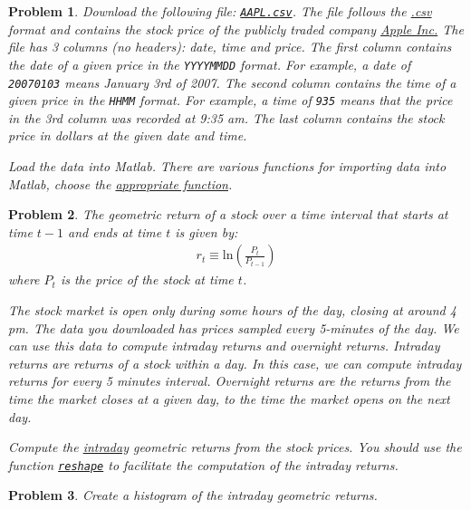 \documentclass[12pt, a4paper]{article}
\renewcommand{\ln}[1]{\text{ln}\left(#1\right)}
\newtheorem{problem}{Problem}
\begin{document}
\begin{problem}
Download the following file: \href{https://github.com/matlab-for-economists/data}{\texttt{AAPL.csv}}.
The file follows the \href{https://en.wikipedia.org/wiki/Comma-separated\_values}{.csv} format and contains the stock price of the publicly traded company \href{https://en.wikipedia.org/wiki/Apple\_Inc.}{Apple Inc.}
The file has 3 columns (no headers): date, time and price.
The first column contains the date of a given price in the \texttt{YYYYMMDD} format.
For example, a date of \texttt{20070103} means January 3rd of 2007.
The second column contains the time of a given price in the \texttt{HHMM} format.
For example, a time of \texttt{935} means that the price in the 3rd column was recorded at 9:35 am.
The last column contains the stock price in dollars at the given date and time.

Load the data into Matlab.
There are various functions for importing data into Matlab, choose the \href{https://www.mathworks.com/help/matlab/import\_export/supported-file-formats.html}{appropriate function}.
\end{problem}

\begin{problem}
The geometric return of a stock over a time interval that starts at time \(t-1\) and ends at time \(t\) is given by:
\begin{align*}
r_t \equiv \ln{\frac{P_t}{P_{t-1}}}
\end{align*}
where \(P_t\) is the price of the stock at time \(t\).

The stock market is open only during some hours of the day, closing at around 4 pm.
The data you downloaded has prices sampled every 5-minutes of the day.
We can use this data to compute intraday returns and overnight returns.
Intraday returns are returns of a stock within a day.
In this case, we can compute intraday returns for every 5 minutes interval.
Overnight returns are the returns from the time the market closes at a given day, to the time the market opens on the next day.

Compute the \uline{intraday} geometric returns from the stock prices.
You should use the function \href{https://www.mathworks.com/help/matlab/ref/reshape.html?s\_tid=doc\_ta}{\texttt{reshape}} to facilitate the computation of the intraday returns.
\end{problem}

\begin{problem}
Create a histogram of the intraday geometric returns.
\end{problem}
\end{document}
